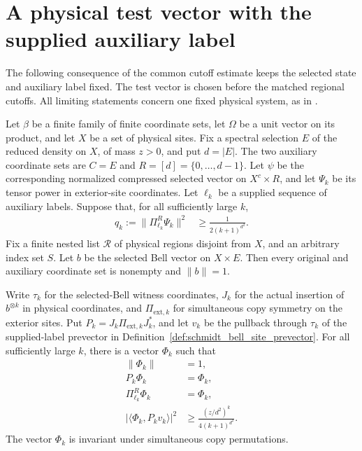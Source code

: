 \section{A physical test vector with the supplied auxiliary label}

The following consequence of the common cutoff estimate keeps the selected
state and auxiliary label fixed. The test vector is chosen before the matched
regional cutoffs. All limiting statements concern one fixed physical system,
as in \cite[Section~8, lines~332--381]{OpenAI2026AreaLaw}.

\begin{theorem}
    \label{thm:schmidt_bell_physical_witness}
    \leanok
    Let $\beta$ be a finite family of finite coordinate sets, let $\Omega$ be
    a unit vector on its product, and let $X$ be a set of physical sites.
    Fix a spectral selection $E$ of the reduced density on $X$, of mass
    $z>0$, and put $d=|E|$. The two auxiliary coordinate sets are $C=E$ and
    $R=[d]=\{0,\ldots,d-1\}$. Let $\psi$ be the corresponding normalized
    compressed selected vector on $X^c\times R$, and let $\Psi_k$ be its
    tensor power in exterior-site coordinates. Let $\ell_k$ be a supplied
    sequence of auxiliary labels. Suppose that, for all sufficiently large $k$,
    \begin{align*}
        q_k:=\|\Pi^{R}_{\ell_k}\Psi_k\|^2
        &\ge \frac{1}{2(k+1)^{d^2}}.
    \end{align*}
    Fix a finite nested list $\mathcal R$ of physical regions disjoint from
    $X$, and an arbitrary index set $S$. Let $b$ be the selected Bell vector
    on $X\times E$. Then every original and auxiliary coordinate set is
    nonempty and $\|b\|=1$.

    Write $\tau_k$ for the selected-Bell witness coordinates, $J_k$ for the
    actual insertion of $b^{\otimes k}$ in physical coordinates, and
    $\Pi_{\mathrm{ext},k}$ for simultaneous copy symmetry on the exterior
    sites. Put $P_k=J_k\Pi_{\mathrm{ext},k}J_k^*$, and let $v_k$ be the
    pullback through $\tau_k$ of the supplied-label prevector in
    Definition~\ref{def:schmidt_bell_site_prevector}.
    For all sufficiently large $k$, there is a vector $\Phi_k$ such that
    \begin{align*}
        \|\Phi_k\|&=1, \\
        P_k\Phi_k&=\Phi_k, \\
        \Pi^R_{\ell_k}\Phi_k&=\Phi_k, \\
        |\langle\Phi_k,P_kv_k\rangle|^2
        &\ge\frac{(z/d^2)^k}{4(k+1)^{d^2}}.
    \end{align*}
    The vector $\Phi_k$ is invariant under simultaneous copy permutations.


\end{theorem}
